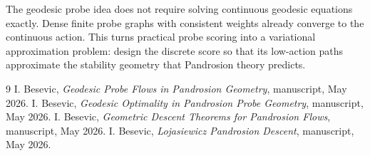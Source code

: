 \documentclass[11pt]{article}
\begin{document}
The geodesic probe idea does not require solving continuous geodesic equations exactly. Dense finite probe graphs with consistent weights already converge to the continuous action. This turns practical probe scoring into a variational approximation problem: design the discrete score so that its low-action paths approximate the stability geometry that Pandrosion theory predicts.

\begin{thebibliography}{9}
I. Besevic, \emph{Geodesic Probe Flows in Pandrosion Geometry}, manuscript, May 2026.
I. Besevic, \emph{Geodesic Optimality in Pandrosion Probe Geometry}, manuscript, May 2026.
I. Besevic, \emph{Geometric Descent Theorems for Pandrosion Flows}, manuscript, May 2026.
I. Besevic, \emph{Lojasiewicz Pandrosion Descent}, manuscript, May 2026.
\end{thebibliography}
\end{document}
